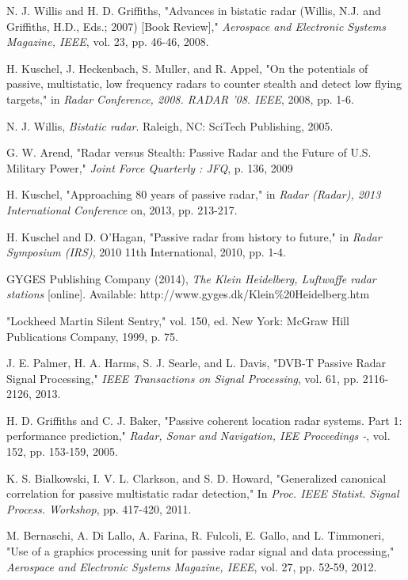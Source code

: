 \documentclass[12pt,openany,a4paper]{book}
\begin{document}
\begin{thebibliography}{99}

 N. J. Willis and H. D. Griffiths, "Advances in bistatic radar (Willis, N.J. and Griffiths, H.D., Eds.; 2007) [Book Review]," \emph{Aerospace and Electronic Systems Magazine, IEEE}, vol. 23, pp. 46-46, 2008.

 H. Kuschel, J. Heckenbach, S. Muller, and R. Appel, "On the potentials of passive, multistatic, low frequency radars to counter stealth and detect low flying targets," in \emph{Radar Conference, 2008. RADAR '08. IEEE}, 2008, pp. 1-6.

 N. J. Willis, \emph{Bistatic radar}. Raleigh, NC: SciTech Publishing, 2005.

 G. W. Arend, "Radar versus Stealth: Passive Radar and the Future of U.S. Military Power," \emph{Joint Force Quarterly : JFQ}, p. 136, 2009

 H. Kuschel, "Approaching 80 years of passive radar," in \emph{Radar (Radar), 2013 International Conference} on, 2013, pp. 213-217.

 H. Kuschel and D. O'Hagan, "Passive radar from history to future," in \emph{Radar Symposium (IRS)}, 2010 11th International, 2010, pp. 1-4.

 GYGES Publishing Company (2014), \emph{The Klein Heidelberg, Luftwaffe radar stations} [online]. Available: http://www.gyges.dk/Klein\%20Heidelberg.htm

 "Lockheed Martin Silent Sentry,"  vol. 150, ed. New York: McGraw Hill Publications Company, 1999, p. 75.

 J. E. Palmer, H. A. Harms, S. J. Searle, and L. Davis, "DVB-T Passive Radar Signal Processing," \emph{IEEE Transactions on Signal Processing}, vol. 61, pp. 2116-2126, 2013.

 H. D. Griffiths and C. J. Baker, "Passive coherent location radar systems. Part 1: performance prediction," \emph{Radar, Sonar and Navigation, IEE Proceedings -}, vol. 152, pp. 153-159, 2005.

 K. S. Bialkowski, I. V. L. Clarkson, and S. D. Howard, "Generalized canonical correlation for passive multistatic radar detection," In \emph{Proc. IEEE Statist. Signal Process. Workshop}, pp. 417-420, 2011.

 M. Bernaschi, A. Di Lallo, A. Farina, R. Fulcoli, E. Gallo, and L. Timmoneri, "Use of a graphics processing unit for passive radar signal and data processing," \emph{Aerospace and Electronic Systems Magazine, IEEE}, vol. 27, pp. 52-59, 2012.


\end{thebibliography}
\end{document}
